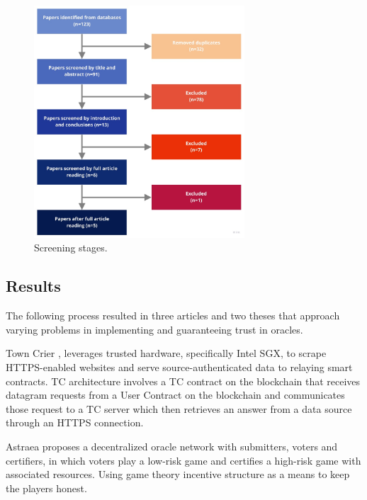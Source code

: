 
\begin{figure}[t]
  \begin{center}
    \leavevmode
    \includegraphics[width=0.7\textwidth]{figures/paper-screening.jpg}
    \caption{Screening stages.}
    \label{fig:/figures/paper-screening}
  \end{center}
\end{figure}


\subsection{Results}

The following process resulted in three articles and two theses that approach varying problems in implementing and guaranteeing trust in oracles.

Town Crier \cite{Zhang2016TownCrier}, leverages trusted hardware, specifically Intel SGX, to scrape HTTPS-enabled websites and serve source-authenticated data to relaying smart contracts. TC architecture involves a TC contract on the blockchain that receives datagram requests from a User Contract on the blockchain and communicates those request to a TC server which then retrieves an answer from a data source through an HTTPS connection.

Astraea \cite{Adler2018Astraea:Oracleb} proposes a decentralized oracle network with submitters, voters and certifiers, in which voters play a low-risk game and certifies a high-risk game with associated resources. Using game theory incentive structure as a means to keep the players honest.

